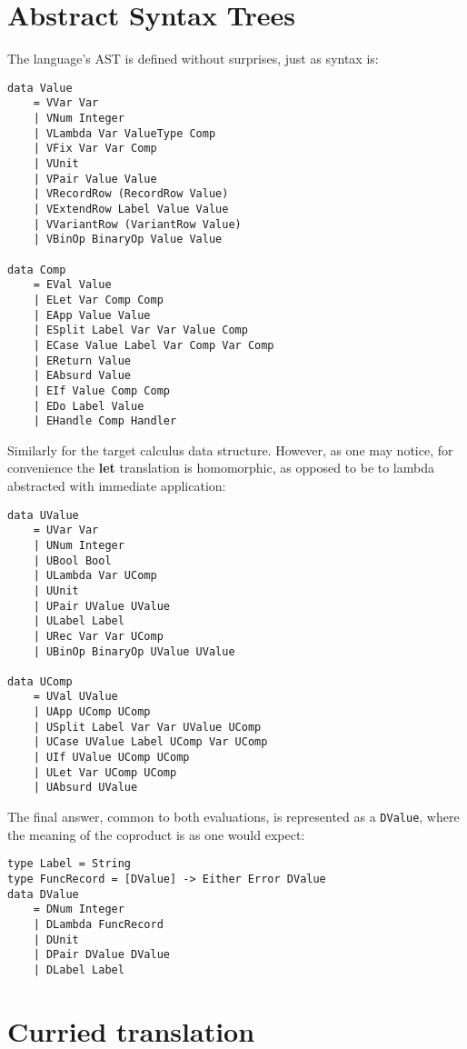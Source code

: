 \documentclass[declaration,shortabstract]{iithesis}
\begin{document}
    \section{Abstract Syntax Trees}
    \label{sec:implementation-ast}

    The language's AST is defined without surprises, just as syntax is:

    \begin{verbatim}
data Value
    = VVar Var
    | VNum Integer
    | VLambda Var ValueType Comp
    | VFix Var Var Comp
    | VUnit
    | VPair Value Value
    | VRecordRow (RecordRow Value)
    | VExtendRow Label Value Value
    | VVariantRow (VariantRow Value)
    | VBinOp BinaryOp Value Value

data Comp
    = EVal Value
    | ELet Var Comp Comp
    | EApp Value Value
    | ESplit Label Var Var Value Comp
    | ECase Value Label Var Comp Var Comp
    | EReturn Value
    | EAbsurd Value
    | EIf Value Comp Comp
    | EDo Label Value
    | EHandle Comp Handler
    \end{verbatim}
    Similarly for the target calculus data structure. However, as one may notice,
    for convenience the \textbf{let} translation is homomorphic, as opposed to be
    to lambda abstracted with immediate application:

    \begin{verbatim}
data UValue
    = UVar Var
    | UNum Integer
    | UBool Bool
    | ULambda Var UComp
    | UUnit
    | UPair UValue UValue
    | ULabel Label
    | URec Var Var UComp
    | UBinOp BinaryOp UValue UValue

data UComp
    = UVal UValue
    | UApp UComp UComp
    | USplit Label Var Var UValue UComp
    | UCase UValue Label UComp Var UComp
    | UIf UValue UComp UComp
    | ULet Var UComp UComp
    | UAbsurd UValue

    \end{verbatim}
    The final answer, common to both evaluations, is represented as a \verb!DValue!,
    where the meaning of the coproduct is as one would expect:

    \begin{verbatim}
type Label = String
type FuncRecord = [DValue] -> Either Error DValue
data DValue
    = DNum Integer
    | DLambda FuncRecord
    | DUnit
    | DPair DValue DValue
    | DLabel Label
    \end{verbatim}

    \section{Curried translation}
\end{document}
